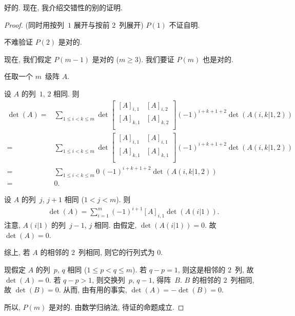 \documentclass[../libro.tex]{subfiles}
\begin{document}
好的.
现在, 我介绍交错性的别的证明.

\begin{proof}
    (同时用按列~\(1\) 展开与按前 \(2\)~列展开)
    \(P(1)\) 不证自明.

    不难验证 \(P(2)\) 是对的.

    现在, 我们假定 \(P(m-1)\) 是对的 (\(m \geq 3\)).
    我们要证 \(P(m)\) 也是对的.

    任取一个 \(m\)~级阵 \(A\).

    设 \(A\) 的列~\(1\), \(2\) 相同.
    则
    \begin{align*}
        \det {(A)}
        = {} &
        \sum_{1 \leq i < k \leq m}
        {\det {
                \begin{bmatrix}
                    [A]_{i,1} & [A]_{i,2} \\
                    [A]_{k,1} & [A]_{k,2} \\
                \end{bmatrix}
            }
            (-1)^{i+k+1+2}
        \det {(A(i,k|1,2))}}
        \\
        = {} &
        \sum_{1 \leq i < k \leq m}
        {\det {
                \begin{bmatrix}
                    [A]_{i,1} & [A]_{i,1} \\
                    [A]_{k,1} & [A]_{k,1} \\
                \end{bmatrix}
            }
            (-1)^{i+k+1+2}
        \det {(A(i,k|1,2))}}
        \\
        = {} &
        \sum_{1 \leq i < k \leq m}
        {0\, (-1)^{i+k+1+2} \det {(A(i,k|1,2))}}
        \\
        = {} & 0.
    \end{align*}

    设 \(A\) 的列~\(j\), \(j+1\) 相同 (\(1 < j < m\)).
    则
    \begin{align*}
        \det {(A)}
        = \sum_{i = 1}^{m} {(-1)^{i + 1} [A]_{i,1}
        \det {(A(i|1))}}.
    \end{align*}
    注意, \(A(i|1)\) 的列~\(j-1\), \(j\) 相同.
    由假定, \(\det {(A(i|1))} = 0\).
    故 \(\det {(A)} = 0\).

    综上,
    若 \(A\) 的相邻的 \(2\)~列相同,
    则它的行列式为 \(0\).

    现假定 \(A\) 的列~\(p\), \(q\) 相同
    (\(1 \leq p < q \leq m\)).
    若 \(q - p = 1\), 则这是相邻的 \(2\)~列,
    故 \(\det {(A)} = 0\).
    若 \(q - p > 1\), 则交换列~\(p\), \(q-1\),
    得阵~\(B\).
    \(B\) 的相邻的 \(2\)~列相同, 故 \(\det {(B)} = 0\).
    从而, 由有用的事实,
    \(\det {(A)} = -\det {(B)} = 0\).

    所以, \(P(m)\) 是对的.
    由数学归纳法, 待证的命题成立.
\end{proof}
\end{document}

